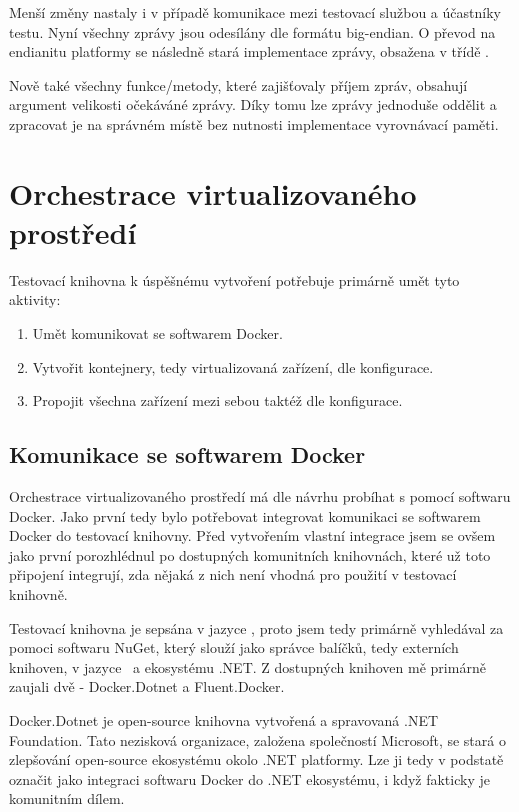 Menší změny nastaly i v případě komunikace mezi testovací službou a účastníky testu. Nyní všechny zprávy jsou odesílány dle formátu big-endian. O převod na endianitu platformy se následně stará implementace zprávy, obsažena v třídě . 

Nově také všechny funkce/metody, které zajišťovaly příjem zpráv, obsahují argument velikosti očekáváné zprávy. Díky tomu lze zprávy jednoduše oddělit a zpracovat je na správném místě bez nutnosti implementace vyrovnávací paměti.

\section{Orchestrace virtualizovaného prostředí}

Testovací knihovna k úspěšnému vytvoření potřebuje primárně umět tyto aktivity:

\begin{enumerate}
    \item Umět komunikovat se softwarem Docker.
    \item Vytvořit kontejnery, tedy virtualizovaná zařízení, dle konfigurace.
    \item Propojit všechna zařízení mezi sebou taktéž dle konfigurace.
\end{enumerate}

\subsection{Komunikace se softwarem Docker}
Orchestrace virtualizovaného prostředí má dle návrhu probíhat s pomocí softwaru Docker. 
Jako první tedy bylo potřebovat integrovat komunikaci se softwarem Docker do testovací knihovny. Před vytvořením vlastní integrace jsem se ovšem jako první porozhlédnul po dostupných komunitních knihovnách, které už toto připojení integrují, zda nějaká z nich není vhodná pro použití v testovací knihovně. 

Testovací knihovna je sepsána v jazyce \csharp, proto jsem tedy primárně vyhledával za pomoci softwaru NuGet\cite{nuget}, který slouží jako správce balíčků, tedy externích knihoven, v jazyce \csharp\, a ekosystému .NET. Z dostupných knihoven mě primárně zaujali dvě - Docker.Dotnet\cite{dockerdotnet} a Fluent.Docker\cite{fluentdocker}. 

Docker.Dotnet je open-source knihovna vytvořená a spravovaná .NET Foundation. Tato nezisková organizace, založena společností Microsoft, se stará o zlepšování open-source ekosystému okolo .NET platformy\cite{dotnetfoundation}. Lze ji tedy v podstatě označit jako  integraci softwaru Docker do .NET ekosystému, i když fakticky je komunitním dílem. 

